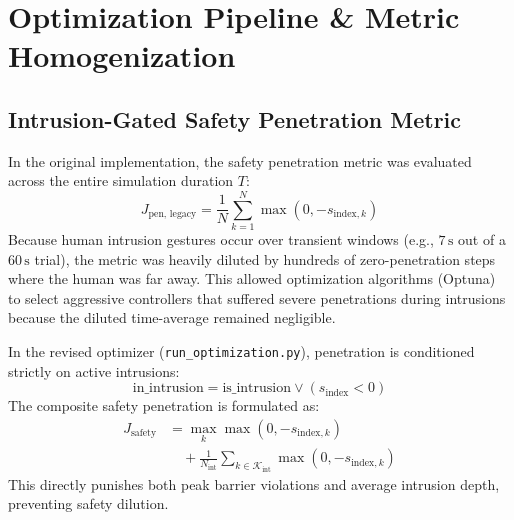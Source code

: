 \documentclass[10pt,twocolumn,a4paper]{article}
\begin{document}
\section{Optimization Pipeline \& Metric Homogenization}

\subsection{Intrusion-Gated Safety Penetration Metric}
In the original implementation, the safety penetration metric was evaluated across the entire simulation duration $T$:
\begin{equation}
J_{\text{pen, legacy}} = \frac{1}{N} \sum_{k=1}^N \max(0, -s_{\text{index}, k})
\end{equation}
Because human intrusion gestures occur over transient windows (e.g., $7\,\text{s}$ out of a $60\,\text{s}$ trial), the metric was heavily diluted by hundreds of zero-penetration steps where the human was far away. This allowed optimization algorithms (Optuna) to select aggressive controllers that suffered severe penetrations during intrusions because the diluted time-average remained negligible.

In the revised optimizer (\texttt{run\_optimization.py}), penetration is conditioned strictly on active intrusions:
\begin{equation}
\text{in\_intrusion} = \text{is\_intrusion} \lor (s_{\text{index}} < 0)
\end{equation}
The composite safety penetration is formulated as:
\begin{align}
J_{\text{safety}} &= \max_{k} \max(0, -s_{\text{index}, k}) \nonumber\\
&\quad + \frac{1}{N_{\text{int}}} \sum_{k \in \mathcal{K}_{\text{int}}} \max(0, -s_{\text{index}, k})
\end{align}
This directly punishes both peak barrier violations and average intrusion depth, preventing safety dilution.
\end{document}
